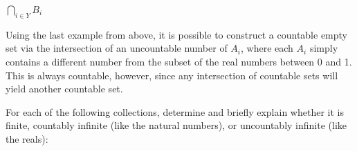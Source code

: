 \documentclass[11pt]{article}
\begin{document}
\begin{Parts}
\Part $\bigcap_{i \in Y} B_i$

\begin{solution}
    Using the last example from above, it is possible to construct a countable 
    empty set via the intersection of an uncountable number of $A_i$, where 
    each $A_i$ simply contains a different number from the subset of the real 
    numbers between 0 and 1. This is always countable, however, since any 
    intersection of countable sets will yield another countable set.
\end{solution}


\end{Parts}


For each of the following collections, determine and briefly explain whether it
is finite, countably infinite (like the natural numbers), or uncountably infinite 
(like the reals):
\end{document}
